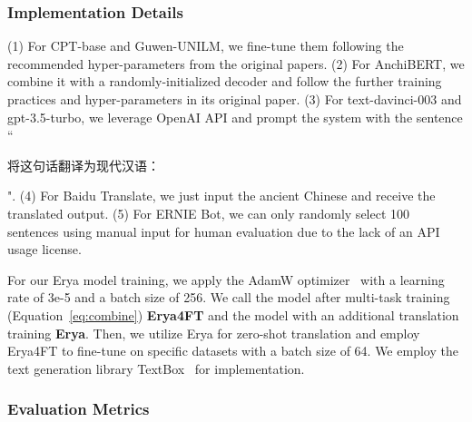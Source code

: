 \subsubsection{Implementation Details}
(1) For CPT-base and Guwen-UNILM, we fine-tune them  following the recommended hyper-parameters from the original papers. %
(2) For AnchiBERT, we combine it with a randomly-initialized decoder and follow the further training practices and hyper-parameters in its original paper. 
(3) For text-davinci-003 and gpt-3.5-turbo, we leverage OpenAI API and prompt the system with the sentence ``\begin{CJK*}{UTF8}{gbsn}将这句话翻译为现代汉语：\end{CJK*}".
(4) For Baidu Translate, we just input the ancient Chinese and receive the translated output.
(5) For ERNIE Bot, we can only randomly select 100 sentences using manual input for human evaluation due to the lack of an API usage license. 


For our Erya model training, we apply the AdamW optimizer~\cite{DBLP:conf/iclr/LoshchilovH19} with a learning rate of 3e-5 and a batch size of 256. We call the model after multi-task training (Equation~\ref{eq:combine}) \textbf{Erya4FT} and the model with an additional translation training \textbf{Erya}.
Then, we utilize Erya for zero-shot translation and employ Erya4FT to fine-tune on specific datasets with a batch size of 64. We employ the text generation library TextBox~\cite{tang-etal-2022-textbox} for implementation.






\subsubsection{Evaluation Metrics}

